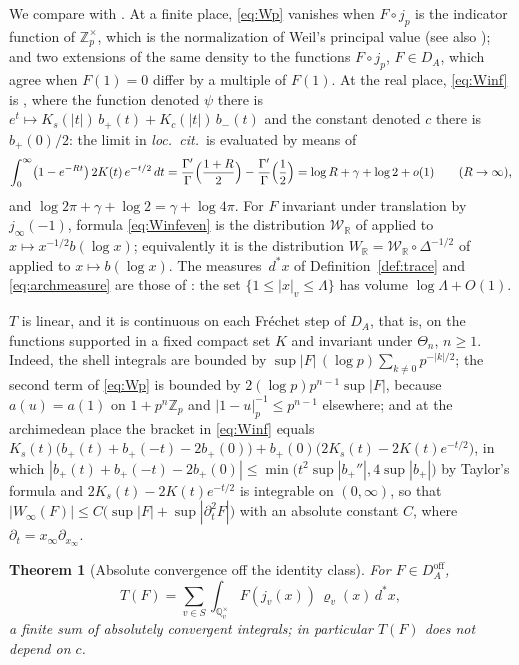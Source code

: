 \documentclass[11pt]{amsart}
\newtheorem{theorem}{Theorem}[section]
\theoremstyle{definition}
\theoremstyle{remark}
\newcommand{\R}{\mathbb R}
\newcommand{\Z}{\mathbb Z}
\newcommand{\Q}{\mathbb Q}
\newcommand{\dstar}{\,d^{*}}
\newcommand{\DA}{D_A}
\begin{document}
We compare with \cite{Connes99}.  At a finite place, \eqref{eq:Wp} vanishes
when $F\circ j_p$ is the indicator function of $\Z_p^{\times}$, which is the
normalization \cite[Appendix~II, (9)]{Connes99} of Weil's principal value
(see also \cite[Lemma~3.5]{MeyerIdele}); and two extensions of the same
density to the functions $F\circ j_p$, $F\in\DA$, which agree when $F(1)=0$
differ by a multiple of $F(1)$.  At the real place, \eqref{eq:Winf} is
\cite[Appendix~II, (10)--(11)]{Connes99}, where the function denoted $\psi$
there is $e^{t}\mapsto K_{s}(|t|)\,b_{+}(t)+K_{c}(|t|)\,b_{-}(t)$ and the
constant denoted $c$ there is $b_{+}(0)/2$: the limit in \emph{loc.\ cit.}\ is
evaluated by means of
\[
\int_0^{\infty}\bigl(1-e^{-Rt}\bigr)\,2K(t)\,e^{-t/2}\,dt
=\frac{\Gamma'}{\Gamma}\Bigl(\frac{1+R}{2}\Bigr)-\frac{\Gamma'}{\Gamma}
\Bigl(\frac12\Bigr)
=\log R+\gamma+\log2+o(1)\qquad(R\to\infty),
\]
and $\log2\pi+\gamma+\log2=\gamma+\log4\pi$.  For $F$ invariant under
translation by $j_{\infty}(-1)$, formula \eqref{eq:Winfeven} is the
distribution $\mathcal W_{\R}$ of \cite[(150)]{CCWeilArch} applied to
$x\mapsto x^{-1/2}b(\log x)$; equivalently it is the distribution
$W_{\R}=\mathcal W_{\R}\circ\Delta^{-1/2}$ of
\cite[Introduction]{CCWeilArch} applied to $x\mapsto b(\log x)$.  The measures $\dstar x$ of
Definition~\ref{def:trace} and \eqref{eq:archmeasure} are those of
\cite[Section~V, (14)]{Connes99}: the set $\{1\le|x|_v\le\Lambda\}$ has
volume $\log\Lambda+O(1)$.

$T$ is linear, and it is continuous on each Fr\'echet step of $\DA$, that is,
on the functions supported in a fixed compact set $K$ and invariant under
$\Theta_n$, $n\ge1$.  Indeed, the shell integrals are
bounded by $\sup|F|\,(\log p)\sum_{k\ne0}p^{-|k|/2}$; the second term of
\eqref{eq:Wp} is bounded by $2(\log p)p^{n-1}\sup|F|$, because $a(u)=a(1)$ on
$1+p^{n}\Z_p$ and $|1-u|_p^{-1}\le p^{n-1}$ elsewhere; and at the archimedean place
the bracket in \eqref{eq:Winf} equals
$K_{s}(t)\bigl(b_{+}(t)+b_{+}(-t)-2b_{+}(0)\bigr)
+b_{+}(0)\bigl(2K_{s}(t)-2K(t)e^{-t/2}\bigr)$, in which
$|b_{+}(t)+b_{+}(-t)-2b_{+}(0)|\le\min\bigl(t^{2}\sup|b_{+}''|,4\sup|b_{+}|\bigr)$
by Taylor's formula and $2K_{s}(t)-2K(t)e^{-t/2}$ is integrable on
$(0,\infty)$, so that
$|W_{\infty}(F)|\le C\bigl(\sup|F|+\sup|\partial_t^{2}F|\bigr)$ with an
absolute constant $C$, where $\partial_t=x_{\infty}\partial_{x_{\infty}}$.

\begin{theorem}[Absolute convergence off the identity class]\label{thm:absconv}
For $F\in\DA^{\mathrm{off}}$,
\begin{equation}\label{eq:absconv}
T(F)=\sum_{v\in S}\int_{\Q_v^{\times}}F(j_v(x))\,\varrho_v(x)\dstar x ,
\end{equation}
a finite sum of absolutely convergent integrals; in particular $T(F)$ does not
depend on $c$.
\end{theorem}
\end{document}
